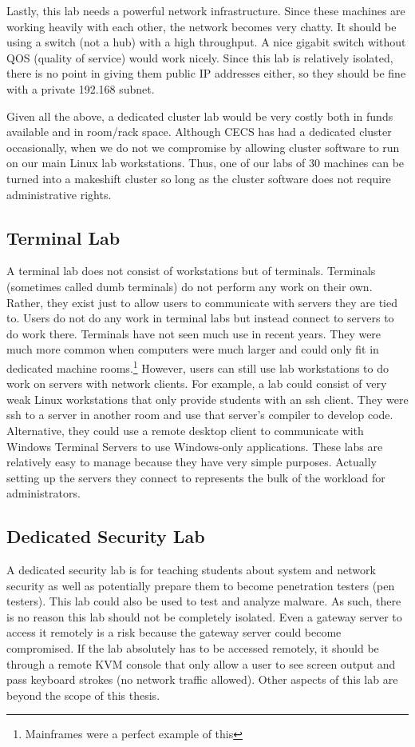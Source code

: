 Lastly, this lab needs a powerful network infrastructure.  Since these machines are working heavily with each other, the network becomes very chatty.  It should be using a switch (not a hub) with a high throughput.  A nice gigabit switch without QOS (quality of service) would work nicely.  Since this lab is relatively isolated, there is no point in giving them public IP addresses either, so they should be fine with a private 192.168 subnet.  

Given all the above, a dedicated cluster lab would be very costly both in funds available and in room/rack space.  Although CECS has had a dedicated cluster occasionally, when we do not we compromise by allowing cluster software to run on our main Linux lab workstations.  Thus, one of our labs of 30 machines can be turned into a makeshift cluster so long as the cluster software does not require administrative rights.  
\subsection{Terminal Lab}
A terminal lab does not consist of workstations but of terminals.  Terminals (sometimes called dumb terminals) do not perform any work on their own.   Rather, they exist just to allow users to communicate with servers they are tied to.  Users do not do any work in terminal labs but instead connect to servers to do work there.  Terminals have not seen much use in recent years.  They were much more common when computers were much larger and could only fit in dedicated machine rooms.\footnote{Mainframes were a perfect example of this}  However, users can still use lab workstations to do work on servers with network clients.  For example, a lab could consist of very weak Linux workstations that only provide students with an ssh client.  They were ssh to a server in another room and use that server's compiler to develop code.  Alternative, they could use a remote desktop client to communicate with Windows Terminal Servers to use Windows-only applications.  These labs are relatively easy to manage because they have very simple purposes.  Actually setting up the servers they connect to represents the bulk of the workload for administrators.  
\subsection{Dedicated Security Lab}
A dedicated security lab is for teaching students about system and network security as well as potentially prepare them to become penetration testers (pen testers).  This lab could also be used to test and analyze malware.  As such, there is no reason this lab should not be completely isolated.  Even a gateway server to access it remotely is a risk because the gateway server could become compromised.  If the lab absolutely has to be accessed remotely, it should be through a remote KVM console that only allow a user to see screen output and pass keyboard strokes (no network traffic allowed).  Other aspects of this lab are beyond the scope of this thesis.  
